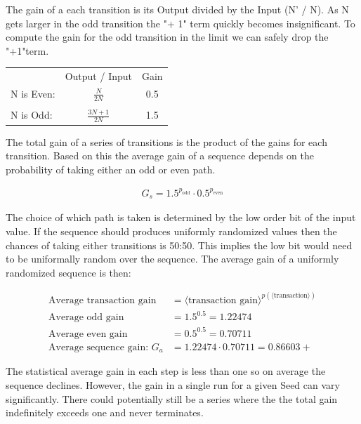 \documentclass[preprint]{sigplanconf}
\begin{document}
The gain of a each transition is its Output divided by the Input (N' / N). As N gets larger in the odd transition the "+ 1" term quickly becomes insignificant. To compute the gain for the odd transition in the limit we can safely drop the "+1"term.

\begin{center}
    \begin{tabular}{l c c}
                   & Output / Input      & Gain \\
        N is Even: & $\frac{N}{2N}$      & 0.5  \\
                   &                     &      \\
        N is Odd:  & $\frac{3N + 1}{2N}$ & 1.5
    \end{tabular}
\end{center}

The total gain of a series of transitions is the product of the gains for each transition. Based on this the average gain of a sequence depends on the probability of taking either an odd or even path.

\begin{align*}
    G_s = 1.5^{p_{\text{odd}}} \cdot 0.5^{p_{\text{even}}}
\end{align*}

The choice of which path is taken is determined by the low order bit of the input value. If the sequence should produces uniformly randomized values then the chances of taking either transitions is 50:50. This implies the low bit would need to be uniformally random over the sequence. The average gain of a uniformly randomized sequence is then:

\begin{align*}
    \text{Average transaction gain}    & = \langle \text{transaction gain} \rangle^{p(\langle \text{transaction} \rangle)} \\
    \text{Average odd gain}            & = 1.5^{0.5} = 1.22474                                                             \\
    \text{Average even gain}           & = 0.5^{0.5} = 0.70711                                                             \\
    \text{Average sequence gain: } G_a & = 1.22474 \cdot 0.70711 = 0.86603+
\end{align*}

The statistical average gain in each step is less than one so on average the sequence declines. However, the gain in a single run for a given Seed can vary significantly. There could potentially still be a series where the the total gain indefinitely exceeds one and never terminates.
\end{document}
